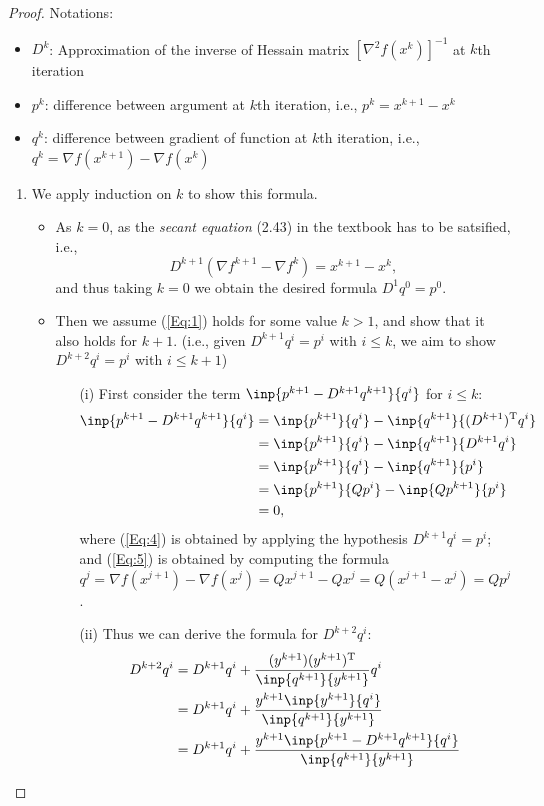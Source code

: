 \begin{enumerate}
\begin{proof}
Notations:
\begin{itemize}
\item
$D^k$: Approximation of the inverse of Hessain matrix $[\nabla^2f(x^k)]^{-1}$ at $k$th iteration
\item
$p^k$: difference between argument at $k$th iteration, i.e., $p^k = x^{k+1} - x^k$
\item
$q^k$: difference between gradient of function at $k$th iteration, i.e., $q^k=\nabla f(x^{k+1}) - \nabla f(x^k)$
\end{itemize}
\begin{enumerate}
\item
We apply induction on $k$ to show this formula.
\begin{itemize}
\item
As $k=0$, as the \emph{secant equation} (2.43) in the textbook has to be satsified, i.e.,
\[
D^{k+1}(\nabla f^{k+1} - \nabla f^k)= x^{k+1} - x^k,
\]
and thus taking $k=0$ we obtain the desired formula $D^1q^0=p^0$.
\item
Then we assume (\ref{Eq:1}) holds for some value $k>1$, and show that it also holds for $k+1$. (i.e., given $D^{k+1}q^i = p^i$ with $i\le k$, we aim to show $D^{k+2}q^{i} = p^{i}$ with $i\le k+1$) 
\begin{enumerate}
\item[(i)]
First consider the term $\inp{p^{k+1}-D^{k+1}q^{k+1}}{q^i}$ for $i\le k$:
\begin{align}
\inp{p^{k+1}-D^{k+1}q^{k+1}}{q^i}&=
\inp{p^{k+1}}{q^i}- 
\inp{q^{k+1}}{(D^{k+1})\trans q^i}\\
&=\inp{p^{k+1}}{q^i}- 
\inp{q^{k+1}}{D^{k+1} q^i}\\
&=\inp{p^{k+1}}{q^i}- \inp{q^{k+1}}{p^i}\label{Eq:4}\\
&=\inp{p^{k+1}}{Qp^i}- \inp{Qp^{k+1}}{p^i}\label{Eq:5}\\
&=0,
\end{align}
where (\ref{Eq:4}) is obtained by applying the hypothesis $D^{k+1}q^i=p^i$; and (\ref{Eq:5}) is obtained by computing the formula $q^j=\nabla f(x^{j+1}) - \nabla f(x^{j}) = Qx^{j+1} - Qx^{j}=Q(x^{j+1}-x^j)=Qp^j$.
\item[(ii)]
Thus we can derive the formula for $D^{k+2}q^i:$
\begin{align}
D^{k+2}q^i&=D^{k+1}q^i+\frac{(y^{k+1})(y^{k+1})\trans}{\inp{q^{k+1}}{y^{k+1}}}q^i\label{Eq:8}\\
&=D^{k+1}q^i+\frac{y^{k+1}\inp{y^{k+1}}{q^i}}{\inp{q^{k+1}}{y^{k+1}}}\\
&=D^{k+1}q^i+\frac{y^{k+1}\inp{p^{k+1} - D^{k+1}q^{k+1}}{q^i}}{\inp{q^{k+1}}{y^{k+1}}}\label{Eq:10}\\

\end{align}
\end{enumerate}
\end{itemize}
\end{enumerate}
\end{proof}
\end{enumerate}
